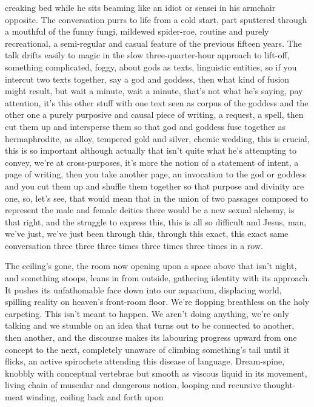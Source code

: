\documentclass[
]{article}
\begin{document}
creaking bed while he sits beaming like an idiot or sensei in his
armchair opposite. The conversation purrs to life from a cold start,
part sputtered through a mouthful of the funny fungi, mildewed
spider-roe, routine and purely recreational, a semi-regular and casual
feature of the previous fifteen years. The talk drifts easily to magic
in the slow three-quarter-hour approach to lift-off, something
complicated, foggy, about gods as texts, linguistic entities, so if you
intercut two texts together, say a god and goddess, then what kind of
fusion might result, but wait a minute, wait a minute, that's not what
he's saying, pay attention, it's this other stuff with one text seen as
corpus of the goddess and the other one a purely purposive and causal
piece of writing, a request, a spell, then cut them up and intersperse
them so that god and goddess fuse together as hermaphrodite, as alloy,
tempered gold and silver, chemic wedding, this is crucial, this is so
important although actually that isn't quite what he's attempting to
convey, we're at cross-purposes, it's more the notion of a statement of
intent, a page of writing, then you take another page, an invocation to
the god or goddess and you cut them up and shuffle them together so that
purpose and divinity are one, so, let's see, that would mean that in the
union of two passages composed to represent the male and female deities
there would be a new sexual alchemy, is that right, and the struggle to
express this, this is all so difficult and Jesus, man, we've just, we've
just been through this, through this exact, this exact same conversation
three three three times three times three times in a row. \par
The ceiling's gone, the room now opening upon a space above that
isn't night, and something stoops, leans in from outside, gathering
identity with its approach. It pushes its unfathomable face down into
our aquarium, displacing world, spilling reality on heaven's front-room
floor. We're flopping breathless on the holy carpeting. This isn't meant
to happen. We aren't doing anything, we're only talking and we stumble
on an idea that turns out to be connected to another, then another, and
the discourse makes its labouring progress upward from one concept to
the next, completely unaware of climbing something's tail until it
flicks, an active spirochete attending this disease of language.
Dream-spine, knobbly with conceptual vertebrae but smooth as viscous
liquid in its movement, living chain of muscular and dangerous notion,
looping and recursive thought-meat winding, coiling back and forth upon
\end{document}
